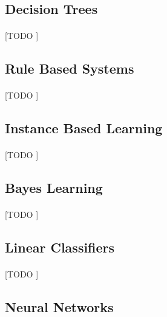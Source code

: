 \documentclass{article}
\begin{document}
		\subsection{Decision Trees}
		\label{sec:decision-trees}

			\paragraph{}
			[TODO ]

		\subsection{Rule Based Systems}
		\label{sec:decision-trees}

			\paragraph{}
			[TODO ]

		\subsection{Instance Based Learning}
		\label{sec:decision-trees}

			\paragraph{}
			[TODO ]

		\subsection{Bayes Learning}
		\label{sec:decision-trees}

			\paragraph{}
			[TODO ]

		\subsection{Linear Classifiers}
		\label{sec:decision-trees}

			\paragraph{}
			[TODO ]

		\subsection{Neural Networks}
		\label{sec:decision-trees}
		
\end{document}
